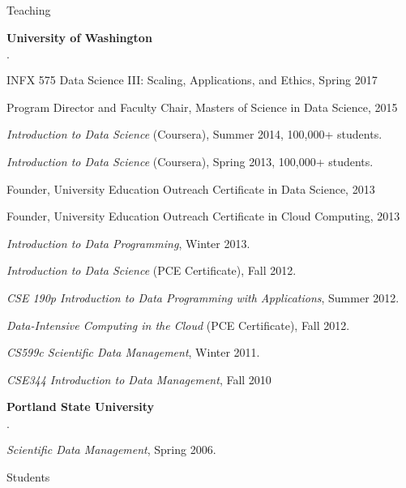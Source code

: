 \documentclass[10pt]{article}
\newenvironment{bulletlist}
   {
      \begin{list}
         {$\cdot$}
         {
            \setlength{\itemsep}{.7ex}
            \setlength{\parsep}{0ex}
            \setlength{\leftmargin}{0.7em}
            \setlength{\parskip}{0ex}
            \setlength{\topsep}{0ex}
         }
   }
   {
      \end{list}
   }
\newcommand{\marginlabel}[1]{
\begin{minipage}[b]{0.8\labelwidth}{\large \textsf{\textbf{#1}}}\end{minipage}}
\newcommand{\entrylabel}[1]{\mbox{\marginlabel{#1}}\hfill}
\newcommand{\MainListlabel}[1]
   {
      \parbox[t]{\labelwidth}{\hspace{.8em}\marginlabel{#1}}
   }
\newenvironment{MainList}[1]
   {
      \renewcommand{\entrylabel}{\MainListlabel}
      \begin{list}{}
      {
         \renewcommand{\makelabel}{\entrylabel}
         \setlength   {\itemindent}{-.65em}
         \setlength   {\labelwidth}{#1}
         \setlength   {\leftmargin}{\labelwidth}
         \setlength   {\itemsep}{3ex}
      }
   }
   {
      \end{list}
   }
\begin{document}
\begin{MainList}{88pt}



\item [Teaching]


{\bf University of Washington}
\begin{bulletlist}
\item INFX 575 Data Science III: Scaling, Applications, and Ethics, Spring 2017
\item Program Director and Faculty Chair, Masters of Science in Data Science, 2015
\item {\em Introduction to Data Science} (Coursera), Summer 2014, 100,000+ students.
\item {\em Introduction to Data Science} (Coursera), Spring 2013, 100,000+ students.
\item Founder, University Education Outreach Certificate in Data Science, 2013
\item Founder, University Education Outreach Certificate in Cloud Computing, 2013
\item {\em Introduction to Data Programming}, Winter 2013.
\item {\em Introduction to Data Science} (PCE Certificate), Fall 2012.
\item {\em CSE 190p Introduction to Data Programming with Applications}, Summer 2012.
\item {\em Data-Intensive Computing in the Cloud}  (PCE Certificate), Fall 2012.
\item {\em CS599c Scientific Data Management}, Winter 2011.
\item {\em CSE344 Introduction to Data Management}, Fall 2010
\end{bulletlist}


{\bf Portland State University}
\begin{bulletlist}
\item {\em Scientific Data Management}, Spring 2006.
\end{bulletlist}

\item [Students]


\end{MainList}
\end{document}
